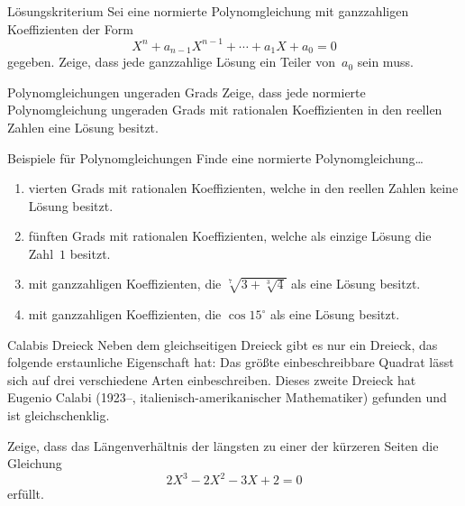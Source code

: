 \documentclass{algblatt}
\begin{document}

\begin{aufgabe}{Lösungskriterium}
Sei eine normierte Polynomgleichung mit ganzzahligen Koeffizienten
der Form
\[ X^n + a_{n-1} X^{n-1} + \cdots + a_1 X + a_0 = 0 \]
gegeben. Zeige, dass
jede ganzzahlige Lösung ein Teiler von~$a_0$ sein muss.
\end{aufgabe}

\begin{aufgabe}{Polynomgleichungen ungeraden Grads}
Zeige, dass jede normierte Polynomgleichung ungeraden Grads mit rationalen
Koeffizienten in den reellen Zahlen eine Lösung besitzt.
\end{aufgabe}

\begin{aufgabe}{Beispiele für Polynomgleichungen}
Finde eine normierte Polynomgleichung\ldots
\begin{enumerate}
\item vierten Grads mit rationalen
Koeffizienten, welche in den reellen Zahlen keine Lösung besitzt.
\item fünften Grads mit rationalen
Koeffizienten, welche als einzige Lösung die Zahl~$1$ besitzt.
\item mit ganzzahligen Koeffizienten, die
$\sqrt[7]{3 + \sqrt[3]{4}}$ als eine Lösung besitzt.
\item mit ganzzahligen Koeffizienten, die
$\cos 15^\circ$ als eine Lösung besitzt.
\end{enumerate}
\end{aufgabe}

\begin{aufgabe}{Calabis Dreieck}
Neben dem gleichseitigen Dreieck gibt es nur ein Dreieck, das folgende erstaunliche
Eigenschaft hat: Das größte 
einbeschreibbare Quadrat lässt sich auf drei verschiedene Arten einbeschreiben.
Dieses zweite Dreieck hat Eugenio Calabi (1923--, italienisch-amerikanischer
Mathematiker) gefunden und ist gleichschenklig.

Zeige, dass das Längenverhältnis der längsten zu einer der kürzeren Seiten die
Gleichung
\[ 2 X^3 - 2 X^2 - 3 X + 2 = 0 \]
erfüllt. \\[1em]

\begin{center}
  \scalebox{0.5}{}
\end{center}
\end{aufgabe}
\end{document}
